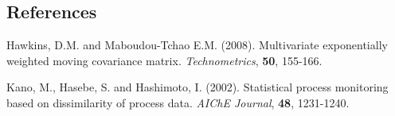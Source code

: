 \documentclass[12pt]{article}
\begin{document}
%
%
%

\subsection*{References}

\begin{description}

\item
Hawkins, D.M. and Maboudou-Tchao E.M. (2008). Multivariate exponentially weighted moving covariance matrix. {\em Technometrics}, {\bf 50}, 155-166.
\item
Kano, M., Hasebe, S. and Hashimoto, I. (2002). Statistical process monitoring based on dissimilarity of process data. {\em AIChE Journal}, {\bf 48}, 1231-1240.


\end{description}
\end{document}
